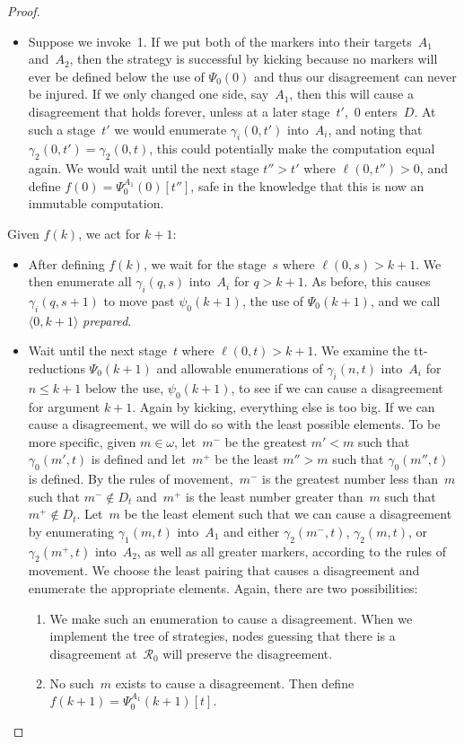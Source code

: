 \documentclass{LMCS}
\newcommand{\0}{\mathbf{0}}
\newcommand{\<}{\langle}
\renewcommand{\>}{\rangle}
\begin{document}
\begin{proof}
\begin{itemize}
\begin{enumerate}
\end{enumerate}
\item Suppose we invoke~1. If we put both of the markers into their
    targets~$A_1$ and~$A_2$, then the strategy is successful by kicking
    because no markers will ever be defined below the use of $\Psi_0(0)$
    and thus our disagreement can never be injured. If we only changed
    one side, say~$A_1$,  then this will cause a disagreement that holds
    forever, unless at a later stage~$t'$,~$0$ enters~$D$. At such a
    stage~$t'$ we would enumerate $\gamma_i(0,t')$ into~$A_i$, and noting
    that $\gamma_2(0,t')=\gamma_2(0,t)$, this could potentially make the
    computation equal again. We would wait until the next stage $t''>t'$
    where $\ell(0,t'')>0$, and define $f(0)=\Psi_0^{A_1}(0)[t'']$, safe
    in the knowledge that this is now an immutable computation.
\end{itemize}

\noindent Given $f(k)$, we act for $k+1$:
\begin{itemize}
\item After defining $f(k)$, we wait for the stage~$s$ where
    $\ell(0,s)>k+1$. We then enumerate all $\gamma_i(q,s)$ into~$A_i$ for
    $q>k+1$. As before, this causes $\gamma_i(q,s+1)$ to move past
    $\psi_0(k+1)$, the use of $\Psi_0(k+1)$, and we call $\< 0, k+1\rangle$
    {\em prepared}.
\item Wait until the next stage~$t$ where $\ell(0,t)> k+1$. We examine
    the tt-reductions $\Psi_0(k+1)$ and allowable enumerations of
    $\gamma_i(n,t)$ into~$A_i$ for $n\le k+1$ below the use,
    $\psi_0(k+1)$, to see if we can cause a disagreement for argument
    $k+1$. Again by kicking, everything else is too big.  If we can cause
    a disagreement, we will do so with the least possible elements.  To
    be more specific, given $m\in\omega$, let~$m^-$ be the greatest
    $m'<m$ such that $\gamma_0(m',t)$ is defined and let~$m^+$ be the
    least $m''>m$ such that $\gamma_0(m'',t)$ is defined. By the rules of
    movement,~$m^-$ is the greatest number less than~$m$ such that
    $m^-\notin D_t$ and~$m^+$ is the least number greater than~$m$ such
    that $m^+\notin D_t$. Let~$m$ be the least element such that we can
    cause a disagreement by enumerating $\gamma_1(m,t)$ into~$A_1$ and
    either $\gamma_2(m^-,t)$, $\gamma_2(m,t)$, or $\gamma_2(m^+,t)$
    into~$A_2$, as well as all greater markers, according to the rules of
    movement.  We choose the least pairing that causes a disagreement and
    enumerate the appropriate elements.  Again, there are two
    possibilities:
\begin{enumerate}
\item We make such an enumeration to cause a disagreement.
When we implement the tree of strategies, nodes guessing that there
is a disagreement at~$\mathcal R_0$ will preserve the disagreement.
\item No such~$m$ exists to cause a disagreement. Then define
    $f(k+1)=\Psi_0^{A_1}(k+1)[t].$
\end{enumerate}
\end{itemize}


\end{proof}
\end{document}
